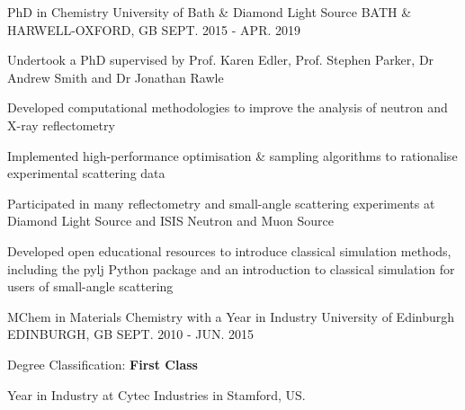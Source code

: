 \begin{cventries}
  \cventry
    {PhD in Chemistry}
    {University of Bath \& Diamond Light Source}
    {BATH \& HARWELL-OXFORD, GB}
    {SEPT. 2015 - APR. 2019}
    {
      \begin{cvitems}
        \item {Undertook a PhD supervised by Prof. Karen Edler, Prof. Stephen Parker, Dr Andrew Smith and Dr Jonathan Rawle}
        \item {Developed computational methodologies to improve the analysis of neutron and X-ray reflectometry}
        \item {Implemented high-performance optimisation \& sampling algorithms to rationalise experimental scattering data}
        \item {Participated in many reflectometry and small-angle scattering experiments at Diamond Light Source and ISIS Neutron and Muon Source}
        \item {Developed open educational resources to introduce classical simulation methods, including the pylj Python package and an introduction to classical simulation for users of small-angle scattering}
      \end{cvitems}
    }
  \cventry
    {MChem in Materials Chemistry with a Year in Industry}
    {University of Edinburgh}
    {EDINBURGH, GB}
    {SEPT. 2010 - JUN. 2015}
    {
      \begin{cvitems}
        \item {Degree Classification: \textbf{First Class}}
        \item {Year in Industry at Cytec Industries in Stamford, US.}
      \end{cvitems}
    }
\end{cventries}
